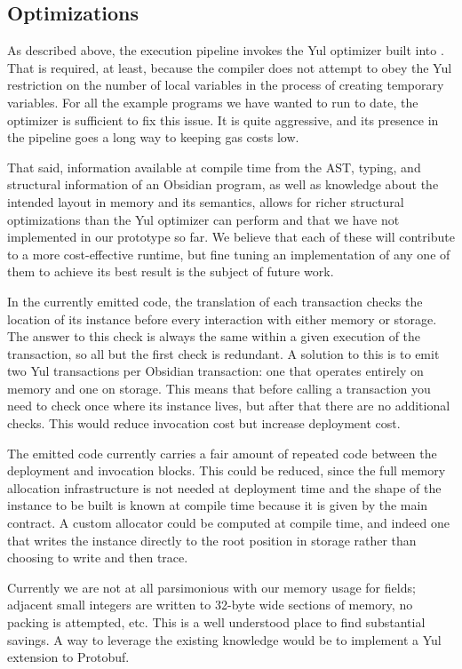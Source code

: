 \subsection{Optimizations}

As described above, the execution pipeline invokes the Yul optimizer built
into \solc. That is required, at least, because the compiler does not
attempt to obey the Yul restriction on the number of local variables in the
process of creating temporary variables. For all the example programs we
have wanted to run to date, the optimizer is sufficient to fix this
issue. It is quite aggressive, and its presence in the pipeline goes a long
way to keeping gas costs low.

That said, information available at compile time from the AST, typing, and
structural information of an Obsidian program, as well as knowledge about
the intended layout in memory and its semantics, allows for richer
structural optimizations than the Yul optimizer can perform and that we
have not implemented in our prototype so far. We believe that each of these
will contribute to a more cost-effective runtime, but fine tuning an
implementation of any one of them to achieve its best result is the subject
of future work.

In the currently emitted code, the translation of each transaction checks
the location of its instance before every interaction with either
memory or storage. The answer to this check is always the same within a
given execution of the transaction, so all but the first check is
redundant. A solution to this is to emit two Yul transactions per Obsidian
transaction: one that operates entirely on memory and one on storage. This
means that before calling a transaction you need to check once where its
instance lives, but after that there are no additional checks. This would reduce invocation cost
but increase deployment cost.

The emitted code currently carries a fair amount of repeated code between
the deployment and invocation blocks. This could be reduced, since the full
memory allocation infrastructure is not needed at deployment time and the
shape of the instance to be built is known at compile time because it is
given by the main contract. A custom allocator could be computed at compile
time, and indeed one that writes the instance directly to the root position
in storage rather than choosing to write and then trace.

Currently we are not at all parsimonious with our memory usage for fields;
adjacent small integers are written to 32-byte wide sections of memory, no
packing is attempted, etc. This is a well understood place to find
substantial savings. A way to leverage the existing knowledge would be to
implement a Yul extension to Protobuf.


